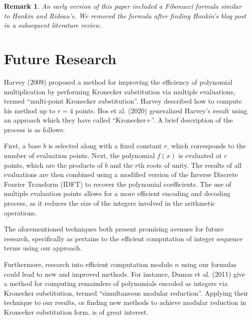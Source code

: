 \documentclass[11pt,reqno]{article}
\theoremstyle{plain}
\newtheorem{remark}{Remark}
\theoremstyle{definition}
\begin{document}
\begin{remark}
An early version of this paper included a Fibonacci formula similar to Hankin and Rideau's. We removed the formula after finding Hankin's blog post in a subsequent literature review.
\end{remark}

\section{Future Research} \label{section:futureresearch}
Harvey (2009) \cite{harvey2009kronecker} proposed a method for improving the efficiency of polynomial multiplication by performing Kronecker substitution via multiple evaluations, termed ``multi-point Kronecker substitution''. Harvey described how to compute his method up to $r=4$ points. Bos et al. (2020) \cite{bos2020postquantum} generalized Harvey's result using an approach which they have called ``Kronecker+''. A brief description of the process is as follows:

First, a base $b$ is selected along with a fixed constant $r$, which corresponds to the number of evaluation points. Next, the polynomial $f(x)$ is evaluated at $r$ points, which are the products of $b$ and the $r$th roots of unity. The results of all evaluations are then combined using a modified version of the Inverse Discrete Fourier Transform (IDFT) to recover the polynomial coefficients. The use of multiple evaluation points allows for a more efficient encoding and decoding process, as it reduces the size of the integers involved in the arithmetic operations.

The aforementioned techniques both present promising avenues for future research, specifically as pertains to the efficient computation of integer sequence terms using our approach.

Furthermore, research into efficient computation modulo $n$ using our formulas could lead to new and improved methods. For instance, Dumas et al. (2011) \cite{dumas2011simulataneous} give a method for computing remainders of polynomials encoded as integers via Kronecker substitution, termed ``simultaneous modular reduction''. Applying their technique to our results, or finding new methods to achieve modular reduction in Kronecker substitution form, is of great interest.
\end{document}
